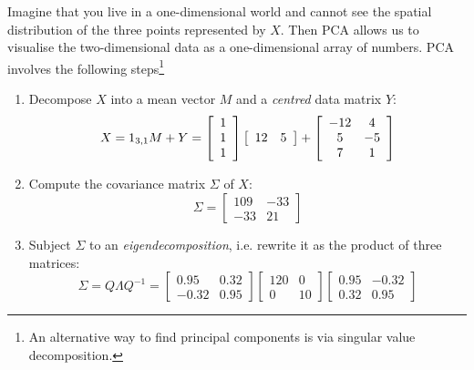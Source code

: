 Imagine that you live in a one-dimensional world and cannot see the
spatial distribution of the three points represented by $X$. Then PCA
allows us to visualise the two-dimensional data as a one-dimensional
array of numbers. PCA involves the following steps\footnote{An
alternative way to find principal components is via singular value
decomposition.}
\begin{enumerate}
\item Decompose $X$ into a mean vector $M$ and a \emph{centred} data
  matrix $Y$:
  \begin{equation}
    X = 1_{3,1} M + Y =
    \left[
      \begin{array}{c}
        1 \\
        1 \\
        1
      \end{array}
      \right]
    \left[
      \begin{array}{cc}
        12 & 5
      \end{array}
      \right]
    +
    \left[
      \begin{array}{cc}
        -12 &  4 \cr
          5 & -5 \cr
          7 &  1
      \end{array}
      \right]
    \label{eq:XMY}
  \end{equation}

\item Compute the covariance matrix $\Sigma$ of $X$:
  \begin{equation}
    \Sigma =
    \left[
      \begin{array}{cc}
        109 & -33 \\
        -33 &  21
      \end{array}
      \right]
  \end{equation}

\item Subject $\Sigma$ to an
  \emph{eigendecomposition}, i.e. rewrite it as the product of three
  matrices:
  \begin{equation}
    \Sigma = Q \Lambda Q^{-1} =
    \left[
      \begin{array}{cc}
         0.95 & 0.32 \\
        -0.32 & 0.95
      \end{array}
      \right]
    \left[
      \begin{array}{cc}
        120 & 0 \\
        0 & 10
      \end{array}
      \right]
    \left[
      \begin{array}{cc}
        0.95 & -0.32 \\
        0.32 & 0.95
      \end{array}
      \right]
    \label{eq:eigen}
  \end{equation}


\end{enumerate}
